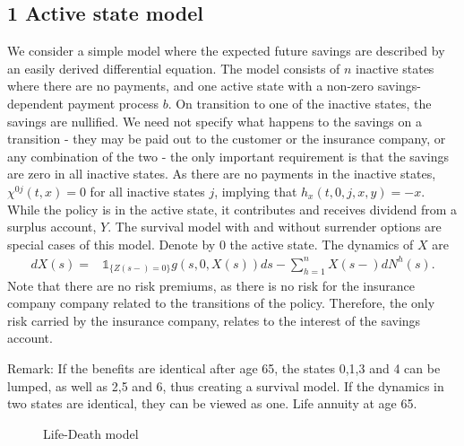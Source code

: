 \documentclass[12pt]{article}
\newcommand{\indic}[1]{\mathds{1}_{ \{ #1 \} }}
\begin{document}
\subsection*{1 Active state model}
We consider a simple model where the expected future savings are described by an easily derived differential equation. The model consists of $n$ inactive states where there are no payments, and one active state with a non-zero savings-dependent payment process $b$. On transition to one of the inactive states, the savings are nullified. We need not specify what happens to the savings on a transition - they may be paid out to the customer or the insurance company, or any combination of the two - the only important requirement is that the savings are zero in all inactive states. As there are no payments in the inactive states, $\chi^{0j}(t,x)=0$ for all inactive states $j$, implying that $h_x(t,0,j,x,y)=-x$. While the policy is in the active state, it contributes and receives dividend from a surplus account, $Y$. The survival model with and without surrender options are special cases of this model. Denote by $0$ the active state. The dynamics of $X$ are
\begin{align*}
dX(s)=& \indic{Z(s-)=0}g(s,0,X(s))ds - \sum_{h=1}^n X(s-)dN^h(s).
\end{align*}
Note that there are no risk premiums, as there is no risk for the insurance company company related to the transitions of the policy. Therefore, the only risk carried by the insurance company, relates to the interest of the savings account.



Remark: If the benefits are identical after age 65, the states 0,1,3 and 4 can be lumped, as well as 2,5 and 6, thus creating a survival model. If the dynamics in two states are identical, they can be viewed as one. Life annuity at age 65.


\def\PlA{(0,0)}
\begin{figure}[H]
\begin{center}
\label{fig:1}
\caption{Life-Death model}
\end{center}
\end{figure}
\end{document}
